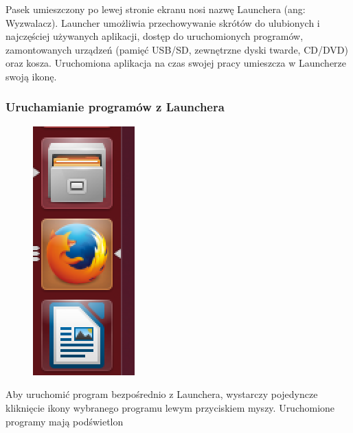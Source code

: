 Pasek umieszczony po lewej stronie ekranu nosi nazwę Launchera (ang: \textcolor{ubuntu_orange}{Wyzwalacz}). Launcher umożliwia przechowywanie skrótów do ulubionych i najczęściej używanych aplikacji, dostęp do uruchomionych programów, zamontowanych urządzeń (pamięć USB/SD, zewnętrzne dyski twarde, CD/DVD) oraz kosza. Uruchomiona aplikacja na czas swojej pracy umieszcza w Launcherze swoją ikonę.

\subsubsection{Uruchamianie programów z Launchera}
\begin{figure}
	\vspace{-10pt}
\includegraphics[width=\linewidth]{images/unity_launcher_programy.png}
\end{figure}

Aby uruchomić program bezpośrednio z Launchera, wystarczy pojedyncze kliknięcie ikony wybranego programu lewym przyciskiem myszy. Uruchomione programy mają podświetlon